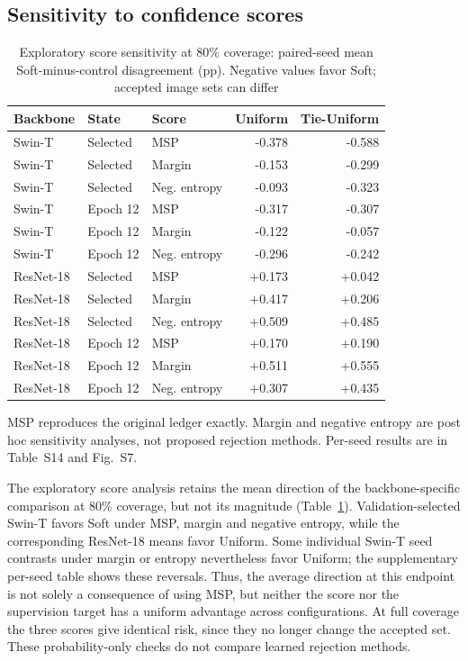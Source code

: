 \subsection{Sensitivity to confidence scores}
\begin{table}[t]
\caption{Exploratory score sensitivity at 80\% coverage: paired-seed mean Soft-minus-control disagreement (pp). Negative values favor Soft; accepted image sets can differ}\label{tab:scores}
\centering\begin{tabular}{lllrr}\toprule
Backbone & State & Score & Uniform & Tie-Uniform\\\midrule
Swin-T & Selected & MSP & -0.378 & -0.588\\
Swin-T & Selected & Margin & -0.153 & -0.299\\
Swin-T & Selected & Neg. entropy & -0.093 & -0.323\\
Swin-T & Epoch 12 & MSP & -0.317 & -0.307\\
Swin-T & Epoch 12 & Margin & -0.122 & -0.057\\
Swin-T & Epoch 12 & Neg. entropy & -0.296 & -0.242\\
ResNet-18 & Selected & MSP & +0.173 & +0.042\\
ResNet-18 & Selected & Margin & +0.417 & +0.206\\
ResNet-18 & Selected & Neg. entropy & +0.509 & +0.485\\
ResNet-18 & Epoch 12 & MSP & +0.170 & +0.190\\
ResNet-18 & Epoch 12 & Margin & +0.511 & +0.555\\
ResNet-18 & Epoch 12 & Neg. entropy & +0.307 & +0.435\\
\bottomrule\end{tabular}\par
\smallskip
MSP reproduces the original ledger exactly. Margin and negative entropy are post hoc sensitivity analyses, not proposed rejection methods. Per-seed results are in Table~S14 and Fig.~S7.\par
\end{table}
The exploratory score analysis retains the mean direction of the backbone-specific comparison at 80\% coverage, but not its magnitude (Table~\ref{tab:scores}). Validation-selected Swin-T favors Soft under MSP, margin and negative entropy, while the corresponding ResNet-18 means favor Uniform. Some individual Swin-T seed contrasts under margin or entropy nevertheless favor Uniform; the supplementary per-seed table shows these reversals. Thus, the average direction at this endpoint is not solely a consequence of using MSP, but neither the score nor the supervision target has a uniform advantage across configurations. At full coverage the three scores give identical risk, since they no longer change the accepted set. These probability-only checks do not compare learned rejection methods.
